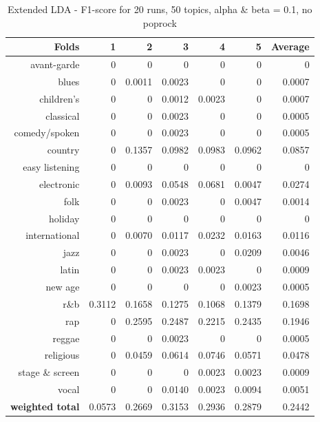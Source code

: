 \begin{table}[h]\label{tab:difflda}
\begin{subtable}[b]{0.8\textwidth}
\begin{tabular}{| r | r | r | r | r | r | r |}
\hline
\textbf{Folds} &  \textbf{1} & \textbf{2} & \textbf{3} & \textbf{4} & \textbf{5} & \textbf{Average}\\
\hline
avant-garde & 0 & 0 & 0 & 0 & 0 & 0\\
blues & 0 & 0.0011 & 0.0023 & 0 & 0 & 0.0007\\
children's & 0 & 0 & 0.0012 & 0.0023 & 0 & 0.0007\\
classical & 0 & 0  & 0.0023 & 0 & 0 & 0.0005\\
comedy/spoken & 0 & 0 & 0.0023 & 0 & 0 & 0.0005 \\
country & 0 & 0.1357 & 0.0982 & 0.0983 & 0.0962 & 0.0857 \\
easy listening & 0 & 0 & 0 & 0 & 0 & 0 \\
electronic & 0 & 0.0093 & 0.0548 & 0.0681 & 0.0047 & 0.0274\\
folk & 0 & 0 & 0.0023 & 0 & 0.0047 & 0.0014\\
holiday & 0 & 0 & 0 & 0 & 0 & 0 \\
international & 0 & 0.0070 & 0.0117 & 0.0232 & 0.0163 & 0.0116\\
jazz & 0 & 0 & 0.0023 & 0 & 0.0209 & 0.0046 \\
latin & 0 & 0 & 0.0023 & 0.0023 & 0 & 0.0009\\
new age & 0 & 0 & 0 & 0 & 0.0023 & 0.0005\\\
r\&b & 0.3112 & 0.1658 & 0.1275 &  0.1068 & 0.1379& 0.1698\\
rap & 0 & 0.2595 & 0.2487 & 0.2215 & 0.2435 & 0.1946\\
reggae & 0 & 0 & 0.0023 & 0 & 0 & 0.0005\\
religious & 0 & 0.0459 & 0.0614 & 0.0746 & 0.0571 & 0.0478\\
stage \& screen & 0 & 0 & 0 & 0.0023 & 0.0023 & 0.0009\\
vocal & 0 & 0 & 0.0140 & 0.0023 & 0.0094 & 0.0051\\
\hline
\textbf{weighted total} &  0.0573 & 0.2669 & 0.3153 & 0.2936 & 0.2879 & 0.2442\\
\hline
\end{tabular}
\caption{Extended LDA - F1-score for 20 runs, 50 topics, alpha \& beta = 0.1, no poprock}
\end{subtable}
\begin{subtable}[b]{0.8\textwidth}

\end{subtable}
\end{table}
